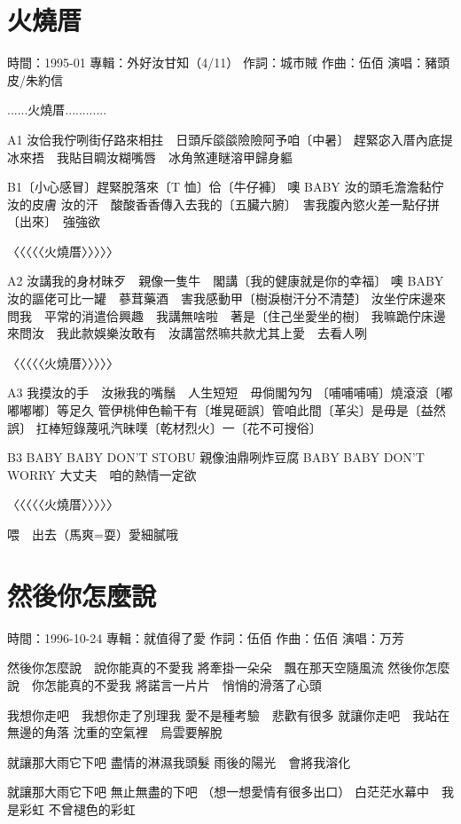 \documentclass[UTF8,a4paper,oneside,twocolumn,12pt]{ctexbook}
\newcommand{\infopair}[2]{\textbullet #1：#2}
\newcommand{\zc}[1][伍佰]{\infopair{作詞}{#1}}
\newcommand{\zq}[1][伍佰]{\infopair{作曲}{#1}}
\newcommand{\zj}[1]{\infopair{專輯}{#1}}
\newcommand{\sj}[1]{\infopair{時間}{#1}}
\newenvironment{info}{\begin{flushleft}\kaishu
	}
	{\end{flushleft}\normalsize\yahei\par}
\newenvironment{lyric}{
	}
{}
\begin{document}
\section{火燒厝}
\begin{info}
	\sj{1995-01}
	\zj{外好汝甘知（4/11）}
	\zc[城市賊]
	\zq[伍佰]
	\infopair{演唱}{豬頭皮/朱約信}
\end{info}
\begin{lyric}
	......火燒厝............

	A1 汝佮我佇咧街仔路來相拄　日頭斥燄燄險險阿予咱〔中暑〕
	趕緊宓入厝內底提冰來捂　我貼目睭汝糊嘴唇　冰角煞連瞇溶甲歸身軀

	B1〔小心感冒〕趕緊脫落來〔T 恤〕佮〔牛仔褲〕
	噢 BABY 汝的頭毛澹澹黏佇汝的皮膚
	汝的汗　酸酸香香傳入去我的〔五臟六腑〕　害我腹內慾火差一點仔拼〔出來〕　強強欲

	〈〈〈〈〈火燒厝〉〉〉〉〉

	A2 汝講我的身材昧歹　親像一隻牛　閣講〔我的健康就是你的幸福〕
	噢 BABY 汝的謳佬可比一罐　蔘茸藥酒　害我感動甲〔樹淚樹汗分不清楚〕
	汝坐佇床邊來問我　平常的消遣佮興趣　我講無啥啦　著是〔住己坐愛坐的樹〕
	我嘛跪佇床邊來問汝　我此款娛樂汝敢有　汝講當然嘛共款尤其上愛　去看人咧

	〈〈〈〈〈火燒厝〉〉〉〉〉

	A3 我摸汝的手　汝揪我的嘴鬚　人生短短　毋倘閣勼勼
	〔哺哺哺哺〕燒滾滾〔嘟嘟嘟嘟〕等足久
	管伊桃伸色輸干有〔堆晃砸誤〕管咱此間〔革尖〕是毋是〔益然誤〕
	扛棒短錄蔑吼汽昧噗〔乾材烈火〕一〔花不可搜俗〕

	B3 BABY BABY DON'T STOBU 親像油鼎咧炸豆腐
	BABY BABY DON'T WORRY 大丈夫　咱的熱情一定欲

	〈〈〈〈〈火燒厝〉〉〉〉〉

	喂　出去（馬爽=耍）愛細膩哦
\end{lyric}

\section{然後你怎麼說}
\begin{info}
	\sj{1996-10-24}
	\zj{就值得了愛}
	\zc
	\zq
	\infopair{演唱}{万芳}
\end{info}
\begin{lyric}
	然後你怎麼說　說你能真的不愛我
	將牽掛一朵朵　飄在那天空隨風流
	然後你怎麼說　你怎能真的不愛我
	將諾言一片片　悄悄的滑落了心頭

	我想你走吧　我想你走了別理我
	愛不是種考驗　悲歡有很多
	就讓你走吧　我站在無邊的角落
	沈重的空氣裡　烏雲要解脫

	就讓那大雨它下吧
	盡情的淋濕我頭髮
	雨後的陽光　會將我溶化

	就讓那大雨它下吧
	無止無盡的下吧
	（想一想愛情有很多出口）
	白茫茫水幕中　我是彩虹
	不曾褪色的彩虹
\end{lyric}
\end{document}
